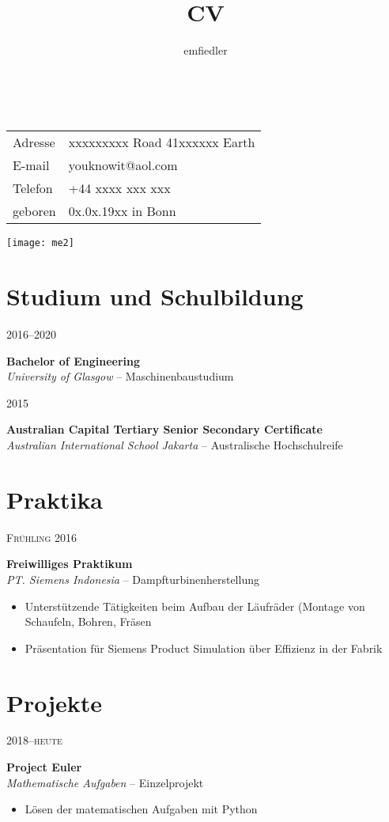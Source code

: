 \documentclass[a4paper]{article}
\title{CV}
\author{emfiedler}
\makeatletter
\renewcommand{\maketitle}{
\begin{flushleft}
{\Huge
\theauthor}\\
\vspace{3mm}
\hspace{3mm} 
\begingroup
\renewcommand{\arraystretch}{1.2}
\begin{tabular}{@{} p{15mm} p{50mm}}
	Adresse	&xxxxxxxxx Road 41\newline xxxxxx Earth\\
	E-mail 	&youknowit@aol.com\\
	Telefon	&+44 xxxx xxx xxx\\
	geboren	&0x.0x.19xx in Bonn
\end{tabular}
\endgroup

\end{flushleft}
}
\newcommand{\entry}[4]{

	\begin{minipage}[t]{.20\textwidth}
		\hfill \textsc{#1}

	\end{minipage}
	\hfill\vline\hfill
	\begin{minipage}[t]{.75\textwidth}
		\textbf{#2}\\ 
		\textit{#3}    
		#4

	\end{minipage} 
	\vspace{.25cm}

}
\makeatother
\begin{document}

\begin{minipage}{0.73\textwidth}
\maketitle
\end{minipage}
\begin{minipage}{0.25\textwidth}
	\hspace{2mm} 
	\vspace{-2mm} 
	\texttt{[image: me2]}
\end{minipage}

\section{Studium und Schulbildung}

\entry{2016--2020}{Bachelor of Engineering}{University of Glasgow}{-- Maschinenbaustudium}

\entry{2015}{Australian Capital Tertiary Senior Secondary Certificate}{Australian International School Jakarta}{-- Australische Hochschulreife}

\section{Praktika}

\entry{Fr{\"u}hling 2016}{Freiwilliges Praktikum}{PT. Siemens Indonesia}{-- Dampfturbinenherstellung\vspace{-.25cm} 
	\begin{itemize}[leftmargin=*]
		\setlength{\itemsep}{-3pt}
		\item Unterst{\"u}tzende T{\"a}tigkeiten beim Aufbau der L{\"a}ufr{\"a}der \newline \phantom{W}(Montage von Schaufeln, Bohren, Fr{\"a}sen
		\item Pr{\"a}sentation f{\"u}r Siemens Product Simulation {\"u}ber Effizienz in der Fabrik
	\end{itemize}	
}

\section{Projekte}

\entry{2018--heute}{Project Euler}{Mathematische Aufgaben}{-- Einzelprojekt\vspace{-.25cm}
	\begin{itemize}[leftmargin=*]
		\setlength{\itemsep}{-3pt}
	\item L{\"o}sen der matematischen Aufgaben mit Python
	\end{itemize}
}
\end{document}
